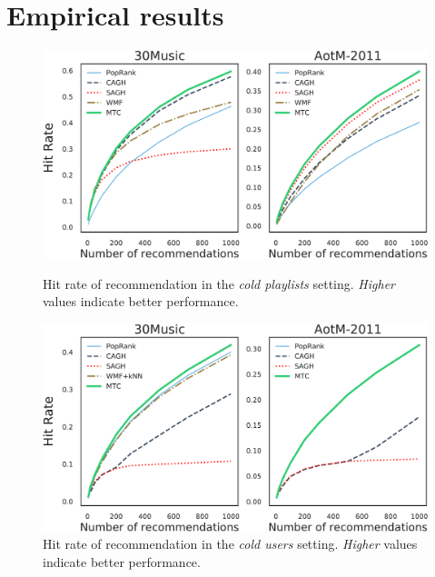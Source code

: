 \clearpage
\newpage
\onecolumn

\section{Empirical results}

%
%
%

\begin{figure}[!h]
    \centering
    \begin{minipage}{0.45\textwidth}
        \centering
        \includegraphics[width=\linewidth]{fig/hr3.pdf}
        \caption{Hit rate of recommendation in the \emph{cold playlists} setting. \emph{Higher} values indicate better performance.}
        \label{fig:hr3}
    \end{minipage}\hspace{15pt}
    \begin{minipage}{0.45\textwidth}
        \centering
        \includegraphics[width=\linewidth]{fig/hr4.pdf}
        \caption{Hit rate of recommendation in the \emph{cold users} setting. \emph{Higher} values indicate better performance.}
        \label{fig:hr4}
    \end{minipage}
\end{figure}

